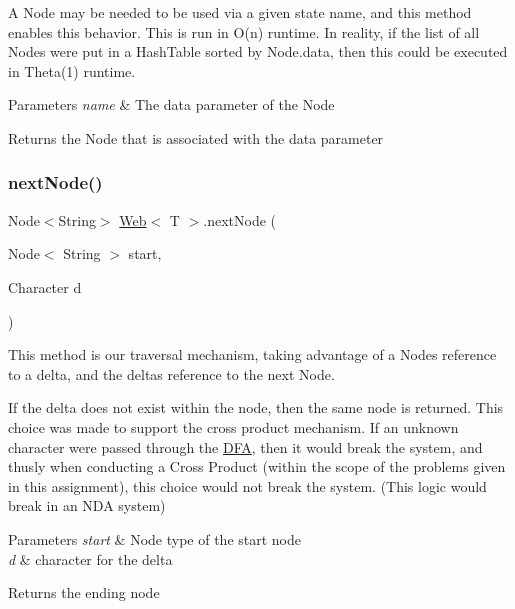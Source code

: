 A Node may be needed to be used via a given state name, and this method enables this behavior. This is run in O(n) runtime. In reality, if the list of all Nodes were put in a Hash\+Table sorted by Node.\+data, then this could be executed in Theta(1) runtime. 
\begin{DoxyParams}{Parameters}
{\em name} & The \textquotesingle{}data\textquotesingle{} parameter of the Node \\
\hline
\end{DoxyParams}
\begin{DoxyReturn}{Returns}
the Node that is associated with the \textquotesingle{}data\textquotesingle{} parameter 
\end{DoxyReturn}
\mbox{\label{class_web_a98350d3dc6cc4db4aa769972a56beb8f}} 
\subsubsection{\texorpdfstring{nextNode()}{nextNode()}}
{\footnotesize\ttfamily Node$<$String$>$ \mbox{\hyperlink{class_web}{Web}}$<$ T $>$.next\+Node (\begin{DoxyParamCaption}\item[{Node$<$ String $>$}]{start,  }\item[{Character}]{d }\end{DoxyParamCaption})\hspace{0.3cm}{\ttfamily [inline]}}

This method is our traversal mechanism, taking advantage of a Node\textquotesingle{}s reference to a delta, and the delta\textquotesingle{}s reference to the next Node.

If the delta does not exist within the node, then the same node is returned. This choice was made to support the cross product mechanism. If an unknown character were passed through the \mbox{\hyperlink{class_d_f_a}{D\+FA}}, then it would break the system, and thusly when conducting a Cross Product (within the scope of the problems given in this assignment), this choice would not break the system. (This logic would break in an N\+DA system) 
\begin{DoxyParams}{Parameters}
{\em start} & Node type of the start node \\
\hline
{\em d} & character for the delta \\
\hline
\end{DoxyParams}
\begin{DoxyReturn}{Returns}
the ending node 
\end{DoxyReturn}
\mbox{\label{class_web_afa2f7442238f2fc0aaa39861398d0240}} 
